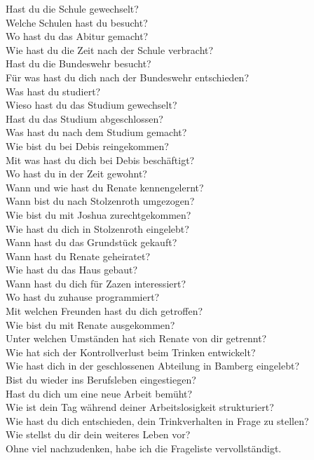 \documentclass[10pt,a4paper]{article}
\begin{document}
\begin{mdframed}[style=daystyle]
  \vskip 2pt
  Hast du die Schule gewechselt? \\
  Welche Schulen hast du besucht? \\
  Wo hast du das Abitur gemacht? \\
  Wie hast du die Zeit nach der Schule verbracht? \\
  Hast du die Bundeswehr besucht? \\
  Für was hast du dich nach der Bundeswehr entschieden? \\
  Was hast du studiert? \\
  Wieso hast du das Studium gewechselt? \\
  Hast du das Studium abgeschlossen? \\
  Was hast du nach dem Studium gemacht? \\
  Wie bist du bei Debis reingekommen? \\
  Mit was hast du dich bei Debis beschäftigt? \\
  Wo hast du in der Zeit gewohnt? \\
  Wann und wie hast du Renate kennengelernt? \\
  Wann bist du nach Stolzenroth umgezogen? \\
  Wie bist du mit Joshua zurechtgekommen? \\
  Wie hast du dich in Stolzenroth eingelebt? \\
  Wann hast du das Grundstück gekauft? \\
  Wann hast du Renate geheiratet? \\
  Wie hast du das Haus gebaut? \\
  Wann hast du dich für Zazen interessiert? \\
  Wo hast du zuhause programmiert? \\
  Mit welchen Freunden hast du dich getroffen? \\
  Wie bist du mit Renate ausgekommen? \\
  Unter welchen Umständen hat sich Renate von dir getrennt? \\
  Wie hat sich der Kontrollverlust beim Trinken entwickelt? \\
  Wie hast dich in der geschlossenen Abteilung in Bamberg eingelebt? \\
  Bist du wieder ins Berufsleben eingestiegen? \\
  Hast du dich um eine neue Arbeit bemüht? \\
  Wie ist dein Tag während deiner Arbeitslosigkeit strukturiert? \\
  Wie hast du dich entschieden, dein Trinkverhalten in Frage zu stellen? \\
  Wie stellst du dir dein weiteres Leben vor? \\
  Ohne viel nachzudenken, habe ich die Frageliste vervollständigt.


\end{mdframed}
\end{document}

